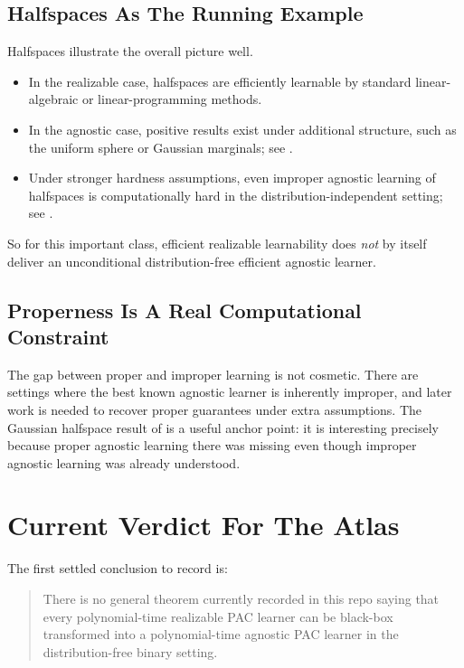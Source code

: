 \subsection{Halfspaces As The Running Example}

Halfspaces illustrate the overall picture well.

\begin{itemize}
\item In the realizable case, halfspaces are efficiently learnable by standard linear-algebraic or linear-programming methods.
\item In the agnostic case, positive results exist under additional structure, such as the uniform sphere or Gaussian marginals; see \citet{daniely2015, diakonikolas2021}.
\item Under stronger hardness assumptions, even improper agnostic learning of halfspaces is computationally hard in the distribution-independent setting; see \citet{tiegel2023}.
\end{itemize}

So for this important class, efficient realizable learnability does \emph{not} by itself deliver an unconditional distribution-free efficient agnostic learner.

\subsection{Properness Is A Real Computational Constraint}

The gap between proper and improper learning is not cosmetic. There are settings where the best known agnostic learner is inherently improper, and later work is needed to recover proper guarantees under extra assumptions. The Gaussian halfspace result of \citet{diakonikolas2021} is a useful anchor point: it is interesting precisely because proper agnostic learning there was missing even though improper agnostic learning was already understood.

\section{Current Verdict For The Atlas}

The first settled conclusion to record is:

\begin{quote}
There is no general theorem currently recorded in this repo saying that every polynomial-time realizable PAC learner can be black-box transformed into a polynomial-time agnostic PAC learner in the distribution-free binary setting.
\end{quote}

